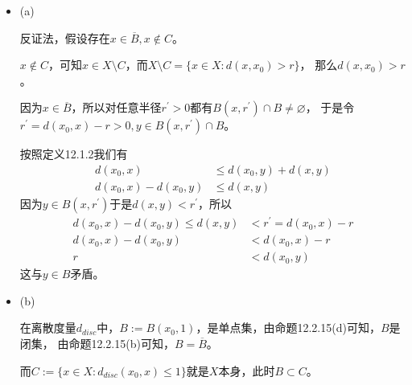 \documentclass{article}
\begin{document}
\begin{itemize}
      \item (a)

            反证法，假设存在$x \in \overline{B}, x \notin C$。

            $x \notin C$，可知$x \in X \setminus C$，而$X \setminus C = \{x \in X: d(x, x_0) > r\}$，
            那么$d(x, x_0) > r$。

            因为$x \in \overline{B}$，所以对任意半径$r^\prime > 0$都有$B(x, r^\prime) \cap B \neq \varnothing$，
            于是令$r^\prime = d(x_0, x) - r > 0, y \in B(x, r^\prime) \cap B$。

            按照定义12.1.2我们有
            \begin{align*}
                  d(x_0, x)             & \leq d(x_0, y) + d(x, y) \\
                  d(x_0, x) - d(x_0, y) & \leq d(x, y)
            \end{align*}
            因为$y \in B(x, r^\prime)$于是$d(x, y) < r^\prime$，所以
            \begin{align*}
                  d(x_0, x) - d(x_0, y) \leq d(x, y) & < r^\prime = d(x_0, x) - r \\
                  d(x_0, x) - d(x_0, y)              & < d(x_0, x) - r            \\
                  r                                  & < d(x_0, y)
            \end{align*}
            这与$y \in B$矛盾。


      \item (b)

            在离散度量$d_{disc}$中，$B := B(x_0, 1)$，是单点集，由命题12.2.15(d)可知，$B$是闭集，
            由命题12.2.15(b)可知，$B = \overline{B}$。

            而$C := \{x \in X: d_{disc}(x_0, x) \leq 1\}$就是$X$本身，此时$B \subset C$。
\end{itemize}
\end{document}
